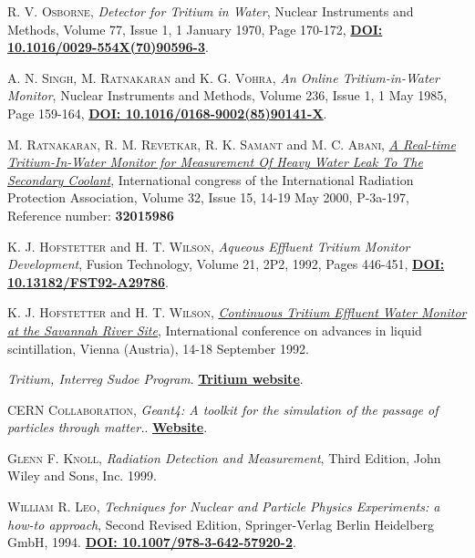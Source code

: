 \begin{thebibliography}{100}
 \textsc{R. V. Osborne},
\textit{Detector for Tritium in Water}, Nuclear Instruments and Methods, Volume 77, Issue 1, 1 January 1970, Page 170-172, \href{https://doi.org/10.1016/0029-554X(70)90596-3}{\textbf{DOI: 10.1016/0029-554X(70)90596-3}}.

 \textsc{A. N. Singh}, \textsc{M. Ratnakaran} and \textsc{K. G. Vohra},
\textit{An Online Tritium-in-Water Monitor}, Nuclear Instruments and Methods, Volume 236, Issue 1, 1 May 1985, Page 159-164, \href{https://doi.org/10.1016/0168-9002(85)90141-X}{\textbf{DOI: 10.1016/0168-9002(85)90141-X}}.

 \textsc{M. Ratnakaran}, \textsc{R. M. Revetkar}, \textsc{R. K. Samant} and \textsc{M. C. Abani},
\href{https://inis.iaea.org/search/search.aspx?orig_q=RN:32015986}{\textit{A Real-time Tritium-In-Water Monitor for Measurement Of Heavy Water Leak To The Secondary Coolant}}, International congress of the International Radiation Protection Association, Volume 32, Issue 15, 14-19 May 2000, P-3a-197, Reference number: \textbf{32015986}

 \textsc{K. J. Hofstetter} and \textsc{H. T. Wilson},
\textit{Aqueous Effluent Tritium Monitor Development}, Fusion Technology, Volume 21, 2P2, 1992, Pages 446-451, \href{https://doi.org/10.13182/FST92-A29786}{\textbf{DOI: 10.13182/FST92-A29786}}.

 \textsc{K. J. Hofstetter} and \textsc{H. T. Wilson},
\href{https://www.osti.gov/biblio/6865647-continuous-tritium-effluent-water-monitor-savannah-river-site}{\textit{Continuous Tritium Effluent Water Monitor at the Savannah River Site}}, International conference on advances in liquid scintillation, Vienna (Austria), 14-18 September 1992.

 \textit{Tritium, Interreg Sudoe Program}. 
\href{https://tritium-sudoe.eu/es-es/homepage}{\textbf{Tritium website}}.

 \textsc{CERN Collaboration},
\textit{Geant4: A toolkit for the simulation of the passage of particles through matter.}. \href{https://geant4.web.cern.ch/node/1}{\textbf{Website}}.

 \textsc{Glenn F. Knoll}, 
\textit{Radiation Detection and Measurement}, Third Edition, John Wiley and Sons, Inc. 1999.

 \textsc{William R. Leo},
\textit{Techniques for Nuclear and Particle Physics Experiments: a how-to approach}, Second Revised Edition, Springer-Verlag Berlin Heidelberg GmbH, 1994. \href{https://doi.org/10.1007/978-3-642-57920-2}{\textbf{DOI: 10.1007/978-3-642-57920-2}}. 


\end{thebibliography}
